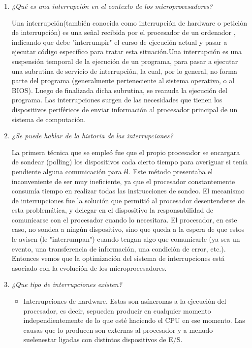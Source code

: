 \documentclass[a4paper,12pt]{article}
\begin{document}
\begin{enumerate}

\item {\it ¿Qué es una interrupción en el contexto de los microprocesadores?}


Una interrupción(también conocida como
interrupción de hardware o petición de interrupción) es una señal recibida por el procesador  de un ordenador , indicando que debe "interrumpir" el curso de ejecución actual y pasar a ejecutar código específico para tratar esta situación.Una interrupción es una suspensión temporal de la ejecución de un programa, para pasar a
ejecutar una subrutina de servicio de interrupción, la cual, por lo general, no forma parte del
programa (generalmente perteneciente al sistema operativo, o al BIOS). Luego de finalizada dicha
subrutina, se reanuda la ejecución del programa.
Las interrupciones surgen de las necesidades que tienen los dispositivos periféricos de enviar
información al procesador principal de un sistema de computación. 


\item {\it  ¿Se puede hablar de la historia de las interrupciones?}

La primera técnica que se
empleó fue que el propio procesador se encargara de sondear (polling) los dispositivos cada cierto
tiempo para averiguar si tenía pendiente alguna comunicación para él. Este método presentaba el 
inconveniente de ser muy ineficiente, ya que el procesador constantemente consumía tiempo en
realizar todas las instrucciones de sondeo.
El mecanismo de interrupciones fue la solución que permitió al procesador desentenderse de esta
problemática, y delegar en el dispositivo la responsabilidad de comunicarse con el procesador
cuando lo necesitara. El procesador, en este caso, no sondea a ningún dispositivo, sino que queda
a la espera de que estos le avisen (le "interrumpan") cuando tengan algo que comunicarle (ya sea
un evento, una transferencia de información, una condición de error, etc.).
Entonces vemos que la optimización del sistema de interrupciones está asociado con la evolución de los microprocesadores.


\newpage %
\item {\it ¿Que tipo de interrupciones existen?}

\begin{itemize}
\item Interrupciones de hardware. Estas son asíncronas a la ejecución del procesador, es decir, sepueden producir en cualquier momento independientemente de lo que esté haciendo el CPU en ese momento. Las causas que lo producen son externas al procesador y a menudo suelenestar ligadas con distintos dispositivos de E/S.


\end{itemize}
\end{enumerate}
\end{document}
